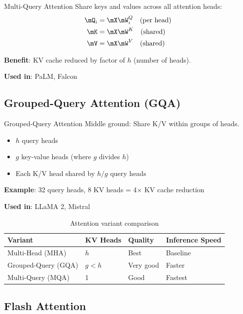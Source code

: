 \begin{mathresult}{Multi-Query Attention}
Share keys and values across all attention heads:
\begin{align}
\mQ_i &= \mX \mW_i^Q \quad \text{(per head)} \\
\mK &= \mX \mW^K \quad \text{(shared)} \\
\mV &= \mX \mW^V \quad \text{(shared)}
\end{align}
\end{mathresult}

\textbf{Benefit}: KV cache reduced by factor of $h$ (number of heads).

\textbf{Used in}: PaLM, Falcon

\subsection{Grouped-Query Attention (GQA)}

\begin{mathresult}{Grouped-Query Attention}
Middle ground: Share K/V within groups of heads.
\begin{itemize}
    \item $h$ query heads
    \item $g$ key-value heads (where $g$ divides $h$)
    \item Each K/V head shared by $h/g$ query heads
\end{itemize}
\end{mathresult}

\textbf{Example}: 32 query heads, 8 KV heads = 4$\times$ KV cache reduction

\textbf{Used in}: LLaMA 2, Mistral

\begin{table}[H]
\centering
\caption{Attention variant comparison}
\begin{tabularx}{\textwidth}{lXXX}
\toprule
\textbf{Variant} & \textbf{KV Heads} & \textbf{Quality} & \textbf{Inference Speed} \\
\midrule
Multi-Head (MHA) & $h$ & Best & Baseline \\
Grouped-Query (GQA) & $g < h$ & Very good & Faster \\
Multi-Query (MQA) & 1 & Good & Fastest \\
\bottomrule
\end{tabularx}
\end{table}

\subsection{Flash Attention}

